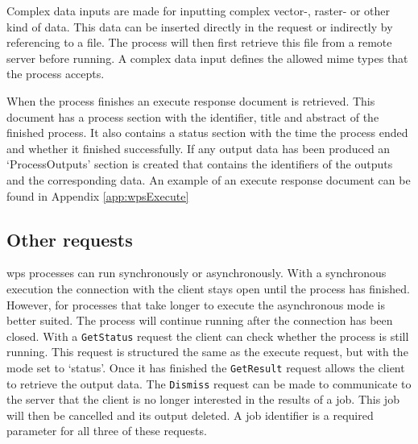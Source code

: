 Complex data inputs are made for inputting complex vector-, raster- or other kind of data. This data can be inserted directly in the request or indirectly by referencing to a file. The process will then first retrieve this file from a remote server before running. A complex data input defines the allowed mime types that the process accepts.  

When the process finishes an execute response document is retrieved. This document has a process section with the identifier, title and abstract of the finished process. It also contains a status section with the time the process ended and whether it finished successfully. If any output data has been produced an `ProcessOutputs' section is created that contains the identifiers of the outputs and the corresponding data. An example of an execute response document can be found in Appendix \ref{app:wpsExecute}

\subsection{Other requests}
\ac{wps} processes can run synchronously or asynchronously. With a synchronous execution the connection with the client stays open until the process has finished. However, for processes that take longer to execute the asynchronous mode is better suited. The process will continue running after the connection has been closed. With a \texttt{GetStatus} request the client can check whether the process is still running. This request is structured the same as the execute request, but with the mode set to `status'. Once it has finished the \texttt{GetResult} request allows the client to retrieve the output data. The \texttt{Dismiss} request can be made to communicate to the server that the client is no longer interested in the results of a job. This job will then be cancelled and its output deleted. A job identifier is a required parameter for all three of these requests. 
